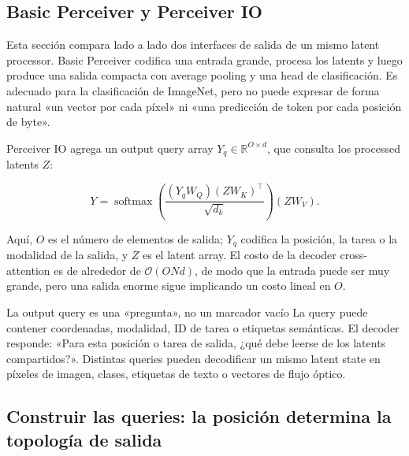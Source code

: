 \subsection{Basic Perceiver y Perceiver IO}

Esta sección compara lado a lado dos interfaces de salida de un mismo latent processor. Basic Perceiver codifica una entrada grande, procesa los latents y luego produce una salida compacta con average pooling y una head de clasificación. Es adecuado para la clasificación de ImageNet, pero no puede expresar de forma natural «un vector por cada píxel» ni «una predicción de token por cada posición de byte».


Perceiver IO agrega un output query array $Y_q\in\mathbb{R}^{O\times d}$, que consulta los processed latents $Z$:

\[
Y=\operatorname{softmax}\!\left(\frac{(Y_qW_Q)(ZW_K)^\top}{\sqrt{d_k}}\right)(ZW_V).
\]

Aquí, $O$ es el número de elementos de salida; $Y_q$ codifica la posición, la tarea o la modalidad de la salida, y $Z$ es el latent array. El costo de la decoder cross-attention es de alrededor de $\mathcal{O}(ONd)$, de modo que la entrada puede ser muy grande, pero una salida enorme sigue implicando un costo lineal en $O$.


\begin{importantbox}{La output query es una «pregunta», no un marcador vacío}
La query puede contener coordenadas, modalidad, ID de tarea o etiquetas semánticas. El decoder responde: «Para esta posición o tarea de salida, ¿qué debe leerse de los latents compartidos?». Distintas queries pueden decodificar un mismo latent state en píxeles de imagen, clases, etiquetas de texto o vectores de flujo óptico.
\end{importantbox}

\subsection{Construir las queries: la posición determina la topología de salida}


